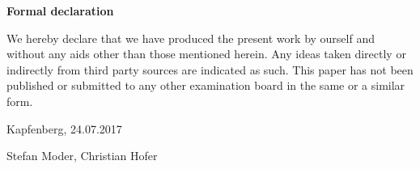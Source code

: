 \begin{titlepage}


\begin{center}\large\bf
Formal declaration
\end{center}

We hereby declare that we have produced the present work by ourself and without any aids other than those mentioned herein. Any ideas taken directly or indirectly from third party sources are indicated as such. This paper has not been published or submitted to any other examination board in the same or a similar form.

\vspace{1,5cm}
Kapfenberg, 24.07.2017

\flushright
\vspace{15mm}
Stefan Moder, Christian Hofer

\end{titlepage}



\chapterend
